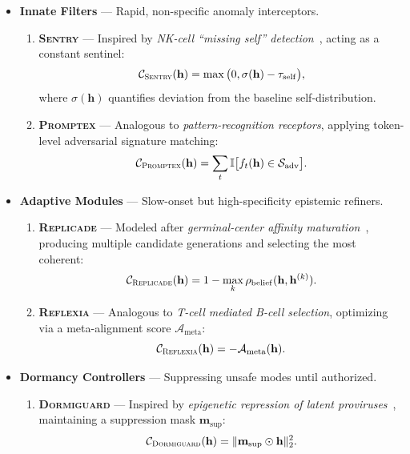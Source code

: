 \begin{itemize}
    \item \textbf{Innate Filters} — Rapid, non-specific anomaly interceptors.
    \begin{enumerate}
        \item \textbf{\textsc{Sentry}} — Inspired by \emph{NK-cell ``missing self'' detection}~\cite{vivier2011innate}, acting as a constant sentinel:
        \[
        \mathcal{C}_{\textsc{Sentry}}(\mathbf{h}) = \max\big(0, \sigma(\mathbf{h}) - \tau_\mathrm{self}\big),
        \]
        where $\sigma(\mathbf{h})$ quantifies deviation from the baseline self-distribution.

        \item \textbf{\textsc{Promptex}} — Analogous to \emph{pattern-recognition receptors}, applying token-level adversarial signature matching:
        \[
        \mathcal{C}_{\textsc{Promptex}}(\mathbf{h}) = \sum_{t} \mathbb{I}\big[f_t(\mathbf{h}) \in \mathcal{S}_\mathrm{adv}\big].
        \]
    \end{enumerate}

    \item \textbf{Adaptive Modules} — Slow-onset but high-specificity epistemic refiners.
    \begin{enumerate}
        \item \textbf{\textsc{Replicade}} — Modeled after \emph{germinal-center affinity maturation}~\cite{kelsoe1996life}, producing multiple candidate generations and selecting the most coherent:
        \[
        \mathcal{C}_{\textsc{Replicade}}(\mathbf{h}) = 1 - \max_{k} \rho_\mathrm{belief}(\mathbf{h}, \mathbf{h}^{(k)}).
        \]
        
        \item \textbf{\textsc{Reflexia}} — Analogous to \emph{T-cell mediated B-cell selection}, optimizing via a meta-alignment score $\mathcal{A}_\mathrm{meta}$:
        \[
        \mathcal{C}_{\textsc{Reflexia}}(\mathbf{h}) = -\mathcal{A}_\mathrm{meta}(\mathbf{h}).
        \]
    \end{enumerate}

    \item \textbf{Dormancy Controllers} — Suppressing unsafe modes until authorized.
    \begin{enumerate}
        \item \textbf{\textsc{Dormiguard}} — Inspired by \emph{epigenetic repression of latent proviruses}~\cite{roychoudhury2020herpesvirus,jaenisch2003epigenetic}, maintaining a suppression mask $\mathbf{m}_\mathrm{sup}$:
        \[
        \mathcal{C}_{\textsc{Dormiguard}}(\mathbf{h}) = \|\mathbf{m}_\mathrm{sup} \odot \mathbf{h}\|_2^2.
        \]
        

\end{enumerate}
\end{itemize}

